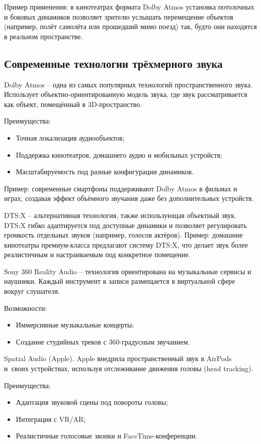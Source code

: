 \documentclass{ou}
\begin{document}
Пример применения: в кинотеатрах формата Dolby Atmos установка потолочных и боковых динамиков позволяет зрителю услышать перемещение объектов (например, полёт самолёта или прошедший мимо поезд) так, будто они находятся в реальном пространстве.
\subsection{Современные технологии трёхмерного звука}
Dolby Atmos -- одна из самых популярных технологий пространственного звука. Использует объектно-ориентированную модель звука, где звук рассматривается как объект, помещённый в 3D-пространство.

Преимущества:
\begin{itemize}[label=-, leftmargin=0em, itemindent=3.35em, nosep]
\item Точная локализация аудиообъектов;
\item Поддержка кинотеатров, домашнего аудио и мобильных устройств;
\item Масштабируемость под разные конфигурации динамиков.
\end{itemize}

Пример: современные смартфоны поддерживают Dolby Atmos в фильмах и играх, создавая эффект объёмного звучания даже без дополнительных устройств.

DTS:X -- альтернативная технология, также использующая объектный звук. DTS:X гибко адаптируется под доступные динамики и позволяет регулировать громкость отдельных звуков (например, голосов актёров). Пример: домашние кинотеатры премиум-класса предлагают систему DTS:X, что делает звук более реалистичным и настраиваемым под конкретное помещение.

Sony 360 Reality Audio -- технология ориентирована на музыкальные сервисы и наушники. Каждый инструмент в записи размещается в виртуальной сфере вокруг слушателя.

Возможности:
\begin{itemize}[label=-, leftmargin=0em, itemindent=3.35em, nosep]
\item Иммерсивные музыкальные концерты;
\item Создание студийных треков с 360-градусным звучанием.
\end{itemize}

Spatial Audio (Apple). Apple внедрила пространственный звук в AirPods и~своих устройствах, используя отслеживание движения головы (head tracking).

Преимущества:
\begin{itemize}[label=-, leftmargin=0em, itemindent=3.35em, nosep]
\item Адаптация звуковой сцены под повороты головы;
\item Интеграция с VR/AR;
\item Реалистичные голосовые звонки и FaceTime-конференции.
\end{itemize}
\end{document}
